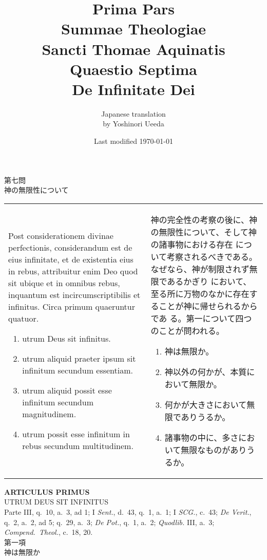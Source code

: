 \documentclass[10pt]{jsarticle} %
\title{{\bf Prima Pars}\\{\HUGE Summae Theologiae}\\Sancti Thomae
Aquinatis\\Quaestio Septima\\{\bf De Infinitate Dei}}
\author{Japanese translation\\by Yoshinori {\sc Ueeda}}
\date{Last modified \today}
\begin{document}
\maketitle

\begin{center}
 {\Large 第七問\\神の無限性について}
\end{center}

\begin{longtable}{p{21em}p{21em}}

Post considerationem divinae perfectionis, considerandum est de eius
 infinitate, et de existentia eius in rebus, attribuitur enim Deo quod
 sit ubique et in omnibus rebus, inquantum est incircumscriptibilis et
 infinitus. Circa primum quaeruntur quatuor. 


\begin{enumerate}
 \item utrum Deus sit
 infinitus.
 \item utrum aliquid praeter ipsum sit infinitum secundum
 essentiam.
 \item utrum aliquid possit esse infinitum secundum
 magnitudinem.
 \item utrum possit esse infinitum in rebus secundum
 multitudinem.
\end{enumerate}

&

神の完全性の考察の後に、神の無限性について、そして神の諸事物における存在
 について考察されるべきである。なぜなら、神が制限されず無限であるかぎり
 において、至る所に万物のなかに存在することが神に帰せられるからであ
 る。第一について四つのことが問われる。

\begin{enumerate}
 \item 神は無限か。
 \item 神以外の何かが、本質において無限か。
 \item 何かが大きさにおいて無限でありうるか。
 \item 諸事物の中に、多さにおいて無限なものがありうるか。
\end{enumerate}

\end{longtable}

\newpage
{}
\begin{center}
 {\Large {\bf ARTICULUS PRIMUS}}\\
 {\large UTRUM DEUS SIT INFINITUS}\\
 {\footnotesize Parte III, q.~10, a.~3, ad 1; I {\itshape Sent.}, d.~43,
 q.~1, a.~1; I {\itshape SCG.}, c.~43; {\itshape De Verit.}, q.~2, a.~2,
 ad 5; q.~29, a.~3; {\itshape De Pot.}, q.~1, a.~2; {\itshape Quodlib.}
 III, a.~3; {\itshape Compend.~Theol.}, c.~18, 20.}\\
 {\Large 第一項\\神は無限か}
\end{center}
\end{document}
